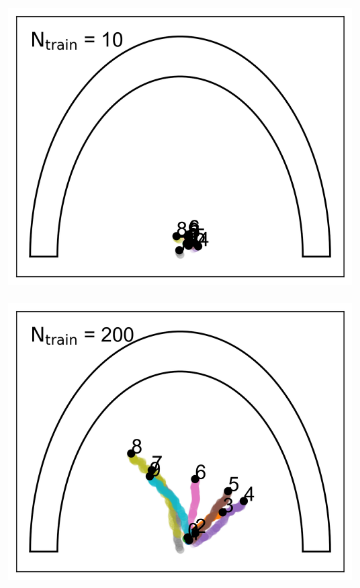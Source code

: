 \documentclass[aps,prb,twocolumn,superscriptaddress,floatfix,longbibliography]{revtex4-2}
\begin{document}
\begin{figure}
\begin{subfigure}[b]{0.24\textwidth}
      \includegraphics[width=\textwidth]{ej2_fig3_1.png}
      \caption{\label{fig:ej2_fig3_1}}
  \end{subfigure}
  \hfill
  \begin{subfigure}[b]{0.24\textwidth}
      \centering
      \includegraphics[width=\textwidth]{ej2_fig3_2.png}
      \caption{\label{fig:ej2_fig3_2}}
  \end{subfigure}
  \hfill
  \begin{subfigure}[b]{0.24\textwidth}
      \centering

\end{subfigure}
\end{figure}
\end{document}
